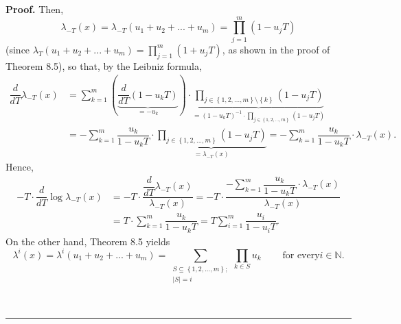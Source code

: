 \documentclass[numbers=enddot,12pt,final,onecolumn,notitlepage]{scrartcl}%
\newenvironment{proof}[1][Proof]{\noindent\textbf{#1.} }{\ \rule{0.5em}{0.5em}}
\begin{document}
\begin{proof}
Then,%
\[
\lambda_{-T}\left(  x\right)  =\lambda_{-T}\left(  u_{1}+u_{2}+...+u_{m}%
\right)  =\prod_{j=1}^{m}\left(  1-u_{j}T\right)
\]
(since $\lambda_{T}\left(  u_{1}+u_{2}+...+u_{m}\right)  =\prod\limits_{j=1}%
^{m}\left(  1+u_{j}T\right)  $, as shown in the proof of Theorem 8.5), so
that, by the Leibniz formula,%
\begin{align*}
\dfrac{d}{dT}\lambda_{-T}\left(  x\right)   &  =\sum_{k=1}^{m}\left(
\underbrace{\dfrac{d}{dT}\left(  1-u_{k}T\right)  }_{=-u_{k}}\right)
\cdot\underbrace{\prod_{j\in\left\{  1,2,...,m\right\}  \setminus\left\{
k\right\}  }\left(  1-u_{j}T\right)  }_{=\left(  1-u_{k}T\right)  ^{-1}%
\cdot\prod\limits_{j\in\left\{  1,2,...,m\right\}  }\left(  1-u_{j}T\right)
}\\
&  =-\sum_{k=1}^{m}\dfrac{u_{k}}{1-u_{k}T}\cdot\underbrace{\prod
\limits_{j\in\left\{  1,2,...,m\right\}  }\left(  1-u_{j}T\right)  }%
_{=\lambda_{-T}\left(  x\right)  }=-\sum_{k=1}^{m}\dfrac{u_{k}}{1-u_{k}T}%
\cdot\lambda_{-T}\left(  x\right)  .
\end{align*}
Hence,%
\begin{align}
-T\cdot\dfrac{d}{dT}\log\lambda_{-T}\left(  x\right)   &  =-T\cdot
\dfrac{\dfrac{d}{dT}\lambda_{-T}\left(  x\right)  }{\lambda_{-T}\left(
x\right)  }=-T\cdot\dfrac{-\sum\limits_{k=1}^{m}\dfrac{u_{k}}{1-u_{k}T}%
\cdot\lambda_{-T}\left(  x\right)  }{\lambda_{-T}\left(  x\right)
}\nonumber\\
&  =T\cdot\sum\limits_{k=1}^{m}\dfrac{u_{k}}{1-u_{k}T}=T\sum\limits_{i=1}%
^{m}\dfrac{u_{i}}{1-u_{i}T}. \label{9.2.2step}%
\end{align}
On the other hand, Theorem 8.5 yields%
\[
\lambda^{i}\left(  x\right)  =\lambda^{i}\left(  u_{1}+u_{2}+...+u_{m}\right)
=\sum\limits_{\substack{S\subseteq\left\{  1,2,...,m\right\}  ;\\\left\vert
S\right\vert =i}}\prod\limits_{k\in S}u_{k}\ \ \ \ \ \ \ \ \ \ \text{for every
}i\in\mathbb{N}.
\]



\end{proof}
\end{document}
